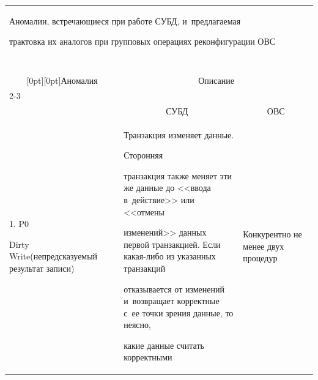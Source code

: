 {


\renewcommand{\baselinestretch}{0.85}


  


\begin{table}\small


\begin{center}


\tabcolsep=3pt




\begin{tabular}{|p{52.7pt}|p{130pt}|p{170.4pt}|}


\multicolumn{3}{p{126mm}}{Аномалии, встречающиеся при работе СУБД, и~предлагаемая 


трактовка их аналогов при групповых операциях реконфигурации ОВС}\\


\multicolumn{3}{c}{\ }\\[-6pt]


\hline


\multicolumn{1}{|c|}{\raisebox{-6pt}[0pt][0pt]{Аномалия}} &\multicolumn{2}{c|}{Описание}\\


\cline{2-3}


&&\\[-9pt]


&\multicolumn{1}{c|}{СУБД~\cite{10-g3}}&


\multicolumn{1}{c|}{ОВС}\\


\hline


1. P0\newline 


Dirty Write\newline (не\-пред\-ска\-зуемый результат записи)&Транзакция изменяет данные.


Сторонняя 


транзакция также меняет эти же данные до <<ввода в~действие>> или <<отмены 


изменений>> данных первой транзакцией. Если ка\-кая-ли\-бо из указанных транзакций 


отказывается от изменений и~возвращает корректные с~ее точки зрения данные, то неясно, 


какие данные считать корректными&


{%


Конкурентно не менее двух процедур 


}
\end{tabular}
\end{center}
\end{table}}
